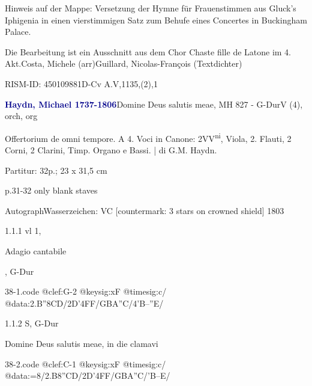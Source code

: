 \documentclass[a4paper, twocolumn, 11pt]{book}
\begin{document}
\newline %
\par Hinweis auf der Mappe: Versetzung der Hymne für Frauenstimmen aus Gluck’s Iphigenia in einen vierstimmigen Satz zum Behufe eines Concertes in Buckingham Palace.
\par Die Bearbeitung ist ein Ausschnitt aus dem Chor {\textquotedbl}Chaste fille de Latone{\textquotedbl} im 4. Akt.\newline Costa, Michele  (arr)\newline Guillard, Nicolas-François  (Textdichter)
\par RISM-ID: 450109881\newline D-Cv  A.V,1135,(2),1
\par \vspace{16pt} \textcolor{darkblue}{\textbf{Haydn, Michael  1737-1806}}\hfillplus{[38]}\newline Domine Deus salutis meae, MH 827 - G-Dur\newline V (4), orch, org
\par \begin{itshape} Offertorium de omni tempore. A 4. Voci in Canone: 2VV\textsuperscript{n}\textsuperscript{i}, Viola, 2. Flauti, 2 Corni, 2 Clarini, Timp. Organo e Bassi. | di G.M. Haydn.\end{itshape} 
\par \textcolor{darkblue}{}  Partitur: 32p.; 23 x 31,5 cm\newline \begin{small} p.31-32 only blank staves\end{small} \newline Autograph\newline Wasserzeichen: VC [countermark: 3 stars on crowned shield]  1803
\par 1.1.1  vl 1, \begin{itshape}Adagio cantabile\end{itshape}, G-Dur  
\begin{filecontents*}{38-1.code}
@clef:G-2
@keysig:xF
@timesig:c/
@data:2.B''{8CD}/2D'4FF/GBA''C/4'B--''E/
\end{filecontents*}

\newline %
\par 1.1.2  S, G-Dur\newline \begin{footnotesize} Domine Deus salutis meae, in die clamavi \end{footnotesize}  
\begin{filecontents*}{38-2.code}
@clef:C-1
@keysig:xF
@timesig:c/
@data:=8/2.B8''CD/2D'4FF/GBA''C/'B--E/
\end{filecontents*}
\end{document}
